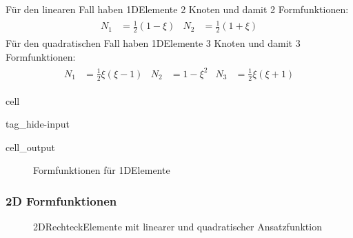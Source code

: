 \documentclass[letterpaper,10pt,german]{jupyterBook}
\let\sphinxpxdimen\pdfpxdimen\else\newdimen\sphinxpxdimen
\begin{document}
\sphinxAtStartPar
Für den linearen Fall haben 1D\sphinxhyphen{}Elemente 2 Knoten und damit 2 Formfunktionen:
\begin{equation}\label{equation:chapters/chapter3/Ansatzfunktionen:1D_Formfunktionen}
\begin{split}\begin{align}
N_1 &= \frac{1}{2} (1 - \xi) & N_2 &= \frac{1}{2} (1 + \xi)
\end{align}\end{split}
\end{equation}
\sphinxAtStartPar
Für den quadratischen Fall haben 1D\sphinxhyphen{}Elemente 3 Knoten und damit 3 Formfunktionen:
\begin{equation}\label{equation:chapters/chapter3/Ansatzfunktionen:1D_Formfunktionen_quad}
\begin{split}\begin{align}
N_1 &= \frac{1}{2} \xi (\xi - 1) & N_2 &= 1 - \xi^2 & N_3 &= \frac{1}{2} \xi (\xi + 1)
\end{align}\end{split}
\end{equation}


\begin{sphinxuseclass}{cell}
\begin{sphinxuseclass}{tag_hide-input}\begin{sphinxVerbatimOutput}

\begin{sphinxuseclass}{cell_output}
\begin{figure}[htbp]
\centering
\capstart

\noindent{}
\caption{Formfunktionen für 1D\sphinxhyphen{}Elemente}\label{\detokenize{chapters/chapter3/Ansatzfunktionen:shapefunctions-1dd}}\end{figure}

\end{sphinxuseclass}\end{sphinxVerbatimOutput}

\end{sphinxuseclass}
\end{sphinxuseclass}

\subsubsection{2D Formfunktionen}
\label{\detokenize{chapters/chapter3/Ansatzfunktionen:id3}}
\begin{figure}[htbp]
\centering
\capstart

\noindent\sphinxincludegraphics[width=500\sphinxpxdimen]{{QuadElements}.png}
\caption{2D\sphinxhyphen{}Rechteck\sphinxhyphen{}Elemente mit linearer und quadratischer Ansatzfunktion}\label{\detokenize{chapters/chapter3/Ansatzfunktionen:quadelements}}\end{figure}
\end{document}
